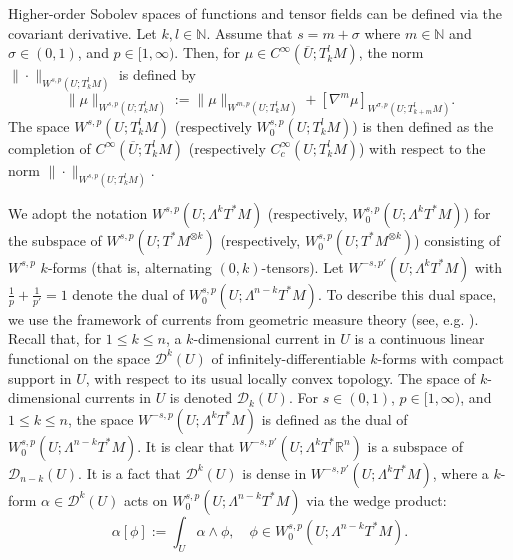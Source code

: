 \documentclass[12pt]{article}
\newcommand{\R}{\mathbb{R}}
\theoremstyle{plain}
\numberwithin{equation}{section}
\begin{document}
    Higher-order Sobolev spaces of functions and tensor fields can be defined via the covariant derivative. Let $k, l \in \mathbb{N}$. Assume that $s = m + \sigma$ where $m \in \mathbb{N}$ and $\sigma \in (0,1)$, and $p \in [1,\infty)$. Then, for $\mu \in C^\infty(\overline U;T^l_k M)$, the norm $\|\cdot\|_{W^{s,p}(U;T^l_k M)}$ is defined by
    \begin{equation*}
        \|\mu\|_{W^{s,p}(U;T^l_k M)} := \|\mu\|_{W^{m,p}(U;T^l_k M)} + [\nabla^m\mu]_{W^{\sigma,p}(U; T^l_{k+m}M)}.
    \end{equation*}
    The space $W^{s,p}(U;T^l_k M)$ (respectively $W^{s,p}_0(U;T^l_k M)$) is then defined as the completion of $C^\infty(\overline U; T^l_k M)$ (respectively $C^\infty_c(U;T^l_k M)$) with respect to the norm $\|\cdot\|_{W^{s,p}(U; T^l_k M)}$.

    We adopt the notation $W^{s,p}(U;\Lambda^kT^*M)$ (respectively, $W_0^{s,p}(U;\Lambda^kT^*M)$) for the subspace of $W^{s,p}(U;T^*M^{\otimes k})$ (respectively, $W_0^{s,p}(U;T^*M^{\otimes k})$) consisting of $W^{s,p}$ $k$-forms (that is, alternating $(0,k)$-tensors). Let $W^{-s,p'}(U;\Lambda^kT^*M)$ with $\frac{1}{p} + \frac{1}{p'} = 1$ denote the dual of $W_0^{s,p}(U;\Lambda^{n-k}T^*M)$. To describe this dual space, we use the framework of currents from geometric measure theory (see, e.g. \cite{simon}). Recall that, for $1\leq k \leq n$, a $k$-dimensional current in $U$ is a continuous linear functional on the space $\mathcal{D}^k(U)$ of infinitely-differentiable $k$-forms with compact support in $U$, with respect to its usual locally convex topology. The space of $k$-dimensional currents in $U$ is denoted $\mathcal{D}_k(U)$. For $s \in (0,1)$, $p \in [1,\infty)$, and $1 \leq k \leq n$, the space $W^{-s,p}(U;\Lambda^k T^*M)$ is defined as the dual of $W^{s,p}_0(U;\Lambda^{n-k}T^*M)$. It is clear that $W^{-s,p'}(U;\Lambda^{k}T^* \R^n)$ is a subspace of $\mathcal{D}_{n-k}(U)$. It is a fact that $\mathcal{D}^{k}(U)$ is dense in $W^{-s,p'}(U;\Lambda^{k}T^* M)$, where a $k$-form $\alpha \in \mathcal{D}^{k}(U)$ acts on $W^{s,p}_0(U;\Lambda^{n-k} T^* M)$ via the wedge product:
    \begin{equation*}
        \alpha[\phi] := \int_U \alpha \wedge \phi, \quad \phi \in W^{s,p}_0(U;\Lambda^{n-k} T^* M).
    \end{equation*}
    
\end{document}
